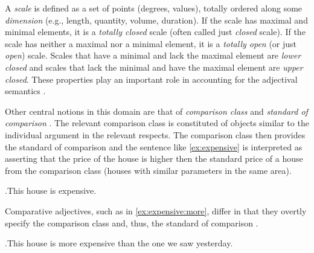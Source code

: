  A \textit{scale} is defined as a set of points (degrees, values), %
 totally ordered along some \textit{dimension} (e.g., length, quantity, volume, duration). If the scale has maximal and minimal elements, it is a \textit{totally closed} scale (often called just \textit{closed} scale). If the scale has neither a maximal nor a minimal element, it is a \textit{totally open} (or just \textit{open}) scale. Scales that have a minimal and lack the maximal element are \textit{lower closed} and scales that lack the minimal and have the maximal element are \textit{upper closed}. These properties play an important role in accounting for the adjectival semantics \citep[see, e.g.,][]{KennedyMcNally:05, RotsteinWinter:04, KaganAlexeyenko:10}.
 
Other central notions in this domain are that of \textit{comparison  class} and \textit{standard of comparison }. The relevant comparison  class \citep[see, e.g.][]{Klein:80, KennedyMcNally:05, Kennedy:07} is constituted of objects similar to the individual argument in the relevant respects. The comparison  class then provides the standard of comparison  and the sentence like \ref{ex:expensive} is interpreted as asserting that the price of the house is higher then the standard price of a house from the comparison  class (houses with similar parameters in the same area).
 
 \ex.\label{ex:expensive}This house is expensive.

Comparative adjectives, such as in \ref{ex:expensive:more}, differ in that they overtly specify the comparison  class and, thus, the standard of comparison . 

 \ex.\label{ex:expensive:more}This house is more expensive than the one we saw yesterday.
 
